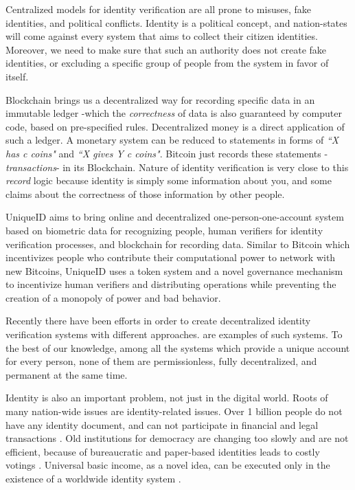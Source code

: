 \documentclass[conference]{IEEEtran}
\begin{document}
Centralized models for identity verification are all prone to misuses, fake identities, and political conflicts. Identity is a political concept, and nation-states will come against every system that aims to collect their citizen identities. Moreover, we need to make sure that such an authority does not create fake identities, or excluding a specific group of people from the system in favor of itself.


Blockchain brings us a decentralized way for recording specific data in an immutable ledger -which the \textit{correctness} of data is also guaranteed by computer code, based on pre-specified rules. Decentralized money is a direct application of such a ledger. A monetary system can be reduced to statements in forms of \textit{``X has c coins"} and \textit{``X gives Y c coins"}. Bitcoin \cite{bitcoin} just records these statements -\textit{transactions}- in its Blockchain. Nature of identity verification is very close to this \textit{record} logic because identity is simply some information about you, and some claims about the correctness of those information by other people. 


UniqueID aims to bring online and decentralized one-person-one-account system based on biometric data for recognizing people, human verifiers for identity verification processes, and blockchain for recording data. Similar to Bitcoin which incentivizes people who contribute their computational power to network with new Bitcoins, UniqueID uses a token system and a novel governance mechanism to incentivize human verifiers and distributing operations while preventing the creation of a monopoly of power and bad behavior.


Recently there have been efforts in order to create decentralized identity verification systems with different approaches. \cite{proofofpersonhood, uport, sovrin} are examples of such systems. To the best of our knowledge, among all the systems which provide a unique account for every person, none of them are permissionless, fully decentralized, and permanent at the same time.


Identity is also an important problem, not just in the digital world. Roots of many nation-wide issues are identity-related issues. Over 1 billion people do not have any identity document, and can not participate in financial and legal transactions \cite{worldbankid}. Old institutions for democracy are changing too slowly and are not efficient, because of bureaucratic and paper-based identities leads to costly votings \cite{democracyearth}. Universal basic income, as a novel idea, can be executed only in the existence of a worldwide identity system \cite{basicincome}.
\end{document}
